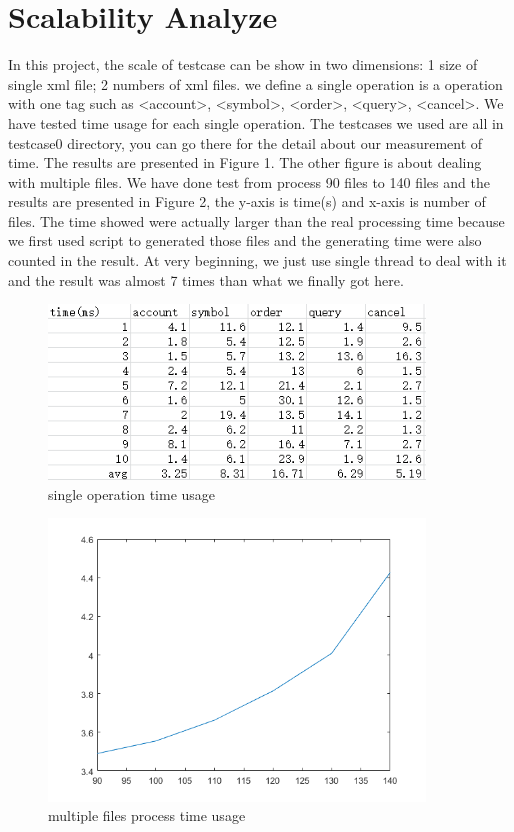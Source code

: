 \documentclass{article}
\begin{document}
\section{Scalability Analyze}
%
In this project, the scale of testcase can be show in two dimensions: 
1 size of single xml file;
2 numbers of xml files.
we define a single operation is a operation with one tag such as <account>, <symbol>, <order>, <query>, <cancel>. We have tested time usage for each single operation. The testcases we used are all in testcase0 directory, you can go there for the detail about our measurement of time. The results are presented in Figure 1. The other figure is about dealing with multiple files. We have done test from process 90 files to 140 files and the results are presented in Figure 2, the y-axis is time(s) and x-axis is number of files. The time showed were actually larger than the real processing time because we first used script to generated those files and the generating time were also counted in the result. At very beginning, we just use single thread to deal with it and the result was almost 7 times than what we finally got here.\\
%
\begin{figure}[h!]
\centering
\includegraphics[width=100mm]{spt}
\caption{single operation time usage}
\label{fig:method}
\end{figure}
%

\begin{figure}[h!]
\centering
\includegraphics[width=100mm]{mfg}
\caption{multiple files process time usage}
\label{fig:method}
\end{figure}
%
\end{document}

